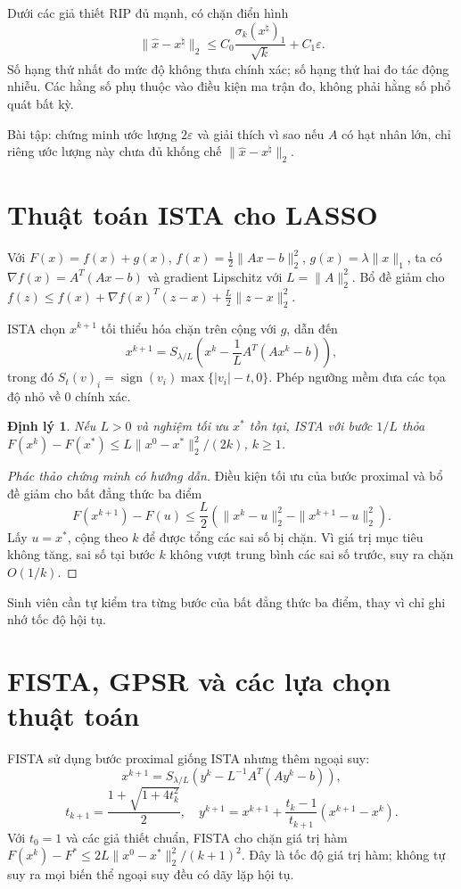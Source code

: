 \documentclass[12pt,a4paper]{article}
\newtheorem{theorem}{Định lý}[section]\newtheorem{lemma}[theorem]{Bổ đề}
\begin{document}
Dưới các giả thiết RIP đủ mạnh, có chặn điển hình
\[\|\widehat x-x^\natural\|_2\le C_0\frac{\sigma_k(x^\natural)_1}{\sqrt k}+C_1\varepsilon.\]
Số hạng thứ nhất đo mức độ không thưa chính xác; số hạng thứ hai đo tác động nhiễu. Các hằng số phụ thuộc vào điều kiện ma trận đo, không phải hằng số phổ quát bất kỳ.

Bài tập: chứng minh ước lượng $2\varepsilon$ và giải thích vì sao nếu $A$ có hạt nhân lớn, chỉ riêng ước lượng này chưa đủ khống chế $\|\widehat x-x^\natural\|_2$.
\clearpage
\section{Thuật toán ISTA cho LASSO}
Với $F(x)=f(x)+g(x)$, $f(x)=\frac12\|Ax-b\|_2^2$, $g(x)=\lambda\|x\|_1$, ta có $\nabla f(x)=A^T(Ax-b)$ và gradient Lipschitz với $L=\|A\|_2^2$. Bổ đề giảm cho $f(z)\le f(x)+\nabla f(x)^T(z-x)+\frac L2\|z-x\|_2^2$.

ISTA chọn $x^{k+1}$ tối thiểu hóa chặn trên cộng với $g$, dẫn đến
\[x^{k+1}=S_{\lambda/L}\left(x^k-\frac1L A^T(Ax^k-b)\right),\]
trong đó $S_t(v)_i=\operatorname{sign}(v_i)\max\{|v_i|-t,0\}$. Phép ngưỡng mềm đưa các tọa độ nhỏ về 0 chính xác.

\begin{theorem}Nếu $L>0$ và nghiệm tối ưu $x^*$ tồn tại, ISTA với bước $1/L$ thỏa $F(x^k)-F(x^*)\le L\|x^0-x^*\|_2^2/(2k)$, $k\ge1$.\end{theorem}
\begin{proof}[Phác thảo chứng minh có hướng dẫn]Điều kiện tối ưu của bước proximal và bổ đề giảm cho bất đẳng thức ba điểm
\[F(x^{k+1})-F(u)\le\frac L2(\|x^k-u\|_2^2-\|x^{k+1}-u\|_2^2).\]
Lấy $u=x^*$, cộng theo $k$ để được tổng các sai số bị chặn. Vì giá trị mục tiêu không tăng, sai số tại bước $k$ không vượt trung bình các sai số trước, suy ra chặn $O(1/k)$.\end{proof}

Sinh viên cần tự kiểm tra từng bước của bất đẳng thức ba điểm, thay vì chỉ ghi nhớ tốc độ hội tụ.
\clearpage
\section{FISTA, GPSR và các lựa chọn thuật toán}
FISTA sử dụng bước proximal giống ISTA nhưng thêm ngoại suy:
\[x^{k+1}=S_{\lambda/L}(y^k-L^{-1}A^T(Ay^k-b)),\]
\[t_{k+1}=\frac{1+\sqrt{1+4t_k^2}}2,\quad y^{k+1}=x^{k+1}+\frac{t_k-1}{t_{k+1}}(x^{k+1}-x^k).\]
Với $t_0=1$ và các giả thiết chuẩn, FISTA cho chặn giá trị hàm $F(x^k)-F^*\le2L\|x^0-x^*\|_2^2/(k+1)^2$. Đây là tốc độ giá trị hàm; không tự suy ra mọi biến thể ngoại suy đều có dãy lặp hội tụ.
\end{document}
